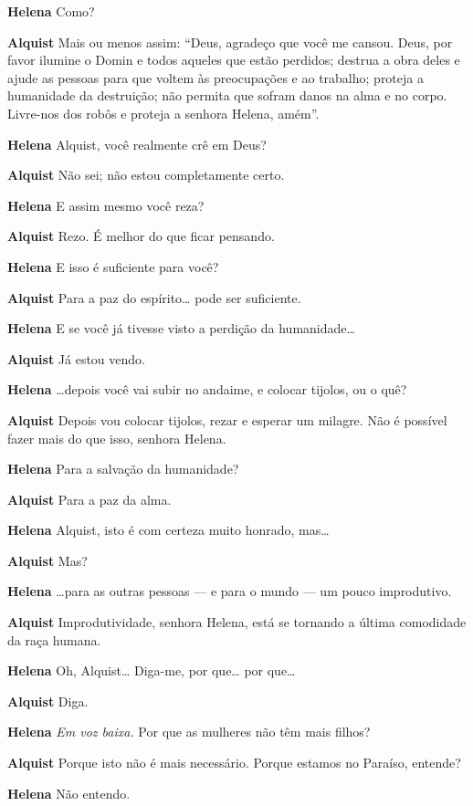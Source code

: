 \textbf{Helena} Como?

\textbf{Alquist} Mais ou menos assim: ``Deus, agradeço que você me cansou. Deus, por
favor ilumine o Domin e todos aqueles que estão perdidos; destrua a obra deles e
ajude as pessoas para que voltem às preocupações e ao trabalho; proteja a
humanidade da destruição; não permita que sofram danos na alma e no corpo.
Livre-nos dos robôs e proteja a senhora Helena, amém''.

\textbf{Helena} Alquist, você realmente crê em Deus?

\textbf{Alquist} Não sei; não estou completamente certo.

\textbf{Helena} E assim mesmo você reza?

\textbf{Alquist} Rezo. É melhor do que ficar pensando.

\textbf{Helena} E isso é suficiente para você?

\textbf{Alquist} Para a paz do espírito\ldots{} pode ser suficiente.

\textbf{Helena} E se você já tivesse visto a perdição da humanidade\ldots{}

\textbf{Alquist} Já estou vendo.

\textbf{Helena} \ldots{}depois você vai subir no andaime, e colocar tijolos, ou o quê?

\textbf{Alquist} Depois vou colocar tijolos, rezar e esperar um milagre. Não é possível
fazer mais do que isso, senhora Helena.

\textbf{Helena} Para a salvação da humanidade?

\textbf{Alquist} Para a paz da alma.

\textbf{Helena} Alquist, isto é com certeza muito honrado, mas\ldots{}

\textbf{Alquist} Mas?

\textbf{Helena} \ldots{}para as outras pessoas --- e para o mundo --- um pouco improdutivo.

\textbf{Alquist} Improdutividade, senhora Helena, está se tornando a última comodidade
da raça humana.

\textbf{Helena} Oh, Alquist\ldots{} Diga-me, por que\ldots{} por que\ldots{}

\textbf{Alquist} Diga.

\textbf{Helena} \emph{Em voz baixa.} Por que as mulheres não têm mais filhos?

\textbf{Alquist} Porque isto não é mais necessário. Porque estamos no Paraíso, entende?

\textbf{Helena} Não entendo.

